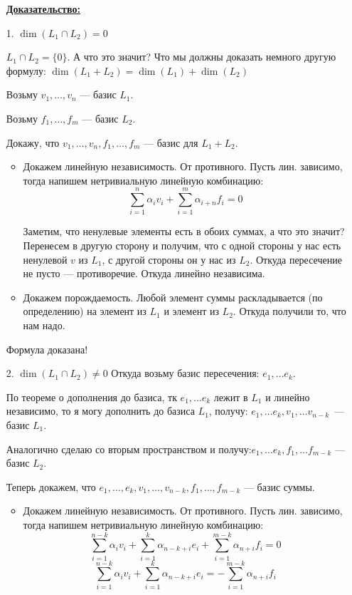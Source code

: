 \documentclass[twoside]{book}
\begin{document}
\begin{enumerate}
    \item[]  \textbf{\uline{Доказательство:}}
    \item[1.] \(\dim (L_1 \cap L_2) = 0\)

          \(L_1 \cap L_2 = \{0\}\). А что это значит? Что мы должны доказать немного другую формулу: \(\dim (L_1 + L_2) = \dim (L_1) + \dim (L_2)\)

          Возьму $v_1,\ldots, v_n$ ---   базис $L_1$.

          Возьму $f_1,\ldots, f_m$ ---  базис $L_2$.

          Докажу, что $v_1,\ldots,v_n,f_1,\ldots,f_m$ --- базис для $L_1+ L_2$.


          \begin{itemize}
              \item Докажем линейную независимость. От противного. Пусть лин. зависимо, тогда напишем нетривиальную линейную комбинацию:
                    $$\sum\limits_{i=1}^n \alpha_i v_i + \sum\limits_{i=1}^m \alpha_{i+n} f_i =0$$

                    Заметим, что ненулевые элементы есть в обоих суммах, а что это значит? Перенесем в другую сторону и получим, что с одной стороны у нас есть ненулевой $v$ из $L_1$, с другой стороны он у нас из $L_2$. Откуда пересечение не пусто --- противоречие. Откуда линейно независима.

              \item Докажем порождаемость. Любой элемент суммы раскладывается (по определению) на элемент из $L_1$ и элемент из $L_2$. Откуда получили то, что нам надо.
          \end{itemize}
          Формула доказана!

    \item[2.]  \(\dim (L_1 \cap L_2) \neq 0\)
          Откуда возьму базис пересечения: \(e_1,\ldots e_k\).

          По теореме о дополнения до базиса, тк \(e_1,\ldots e_k\) лежит в $L_1$ и линейно независимо, то я могу дополнить до базиса \(L_1\), получу: \(e_1,\ldots e_k, v_1, \ldots v_{n-k}\)~--- базис $L_1$.

          Аналогично сделаю со вторым пространством и получу:\(e_1,\ldots e_k, f_1, \ldots f_{m-k}\) --- базис $L_2$.

          Теперь докажем, что \(e_1,\ldots,e_k,v_1,\ldots,v_{n-k}, f_1, \ldots, f_{m-k}\) --- базис суммы.

          \begin{itemize}
              \item Докажем линейную независимость. От противного. Пусть лин. зависимо, тогда напишем нетривиальную линейную комбинацию:
                    $$\sum\limits_{i=1}^{n-k} \alpha_i v_i + \sum\limits_{i=1}^{k}\alpha_{n-k+i}e_i +\sum\limits_{i=1}^{m-k}\alpha_{n+i}f_i =0$$
                    $$\sum\limits_{i=1}^{n-k} \alpha_i v_i + \sum\limits_{i=1}^{k}\alpha_{n-k+i}e_i =-\sum\limits_{i=1}^{m-k}\alpha_{n+i}f_i $$


\end{itemize}
\end{enumerate}
\end{document}
